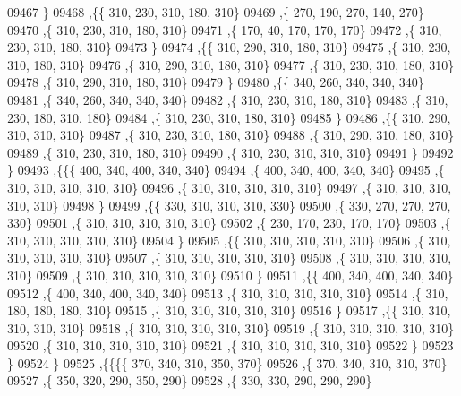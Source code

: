 \begin{DoxyCode}
09467     \}
09468    ,\{\{   310,   230,   310,   180,   310\}
09469     ,\{   270,   190,   270,   140,   270\}
09470     ,\{   310,   230,   310,   180,   310\}
09471     ,\{   170,    40,   170,   170,   170\}
09472     ,\{   310,   230,   310,   180,   310\}
09473     \}
09474    ,\{\{   310,   290,   310,   180,   310\}
09475     ,\{   310,   230,   310,   180,   310\}
09476     ,\{   310,   290,   310,   180,   310\}
09477     ,\{   310,   230,   310,   180,   310\}
09478     ,\{   310,   290,   310,   180,   310\}
09479     \}
09480    ,\{\{   340,   260,   340,   340,   340\}
09481     ,\{   340,   260,   340,   340,   340\}
09482     ,\{   310,   230,   310,   180,   310\}
09483     ,\{   310,   230,   180,   310,   180\}
09484     ,\{   310,   230,   310,   180,   310\}
09485     \}
09486    ,\{\{   310,   290,   310,   310,   310\}
09487     ,\{   310,   230,   310,   180,   310\}
09488     ,\{   310,   290,   310,   180,   310\}
09489     ,\{   310,   230,   310,   180,   310\}
09490     ,\{   310,   230,   310,   310,   310\}
09491     \}
09492    \}
09493   ,\{\{\{   400,   340,   400,   340,   340\}
09494     ,\{   400,   340,   400,   340,   340\}
09495     ,\{   310,   310,   310,   310,   310\}
09496     ,\{   310,   310,   310,   310,   310\}
09497     ,\{   310,   310,   310,   310,   310\}
09498     \}
09499    ,\{\{   330,   310,   310,   310,   330\}
09500     ,\{   330,   270,   270,   270,   330\}
09501     ,\{   310,   310,   310,   310,   310\}
09502     ,\{   230,   170,   230,   170,   170\}
09503     ,\{   310,   310,   310,   310,   310\}
09504     \}
09505    ,\{\{   310,   310,   310,   310,   310\}
09506     ,\{   310,   310,   310,   310,   310\}
09507     ,\{   310,   310,   310,   310,   310\}
09508     ,\{   310,   310,   310,   310,   310\}
09509     ,\{   310,   310,   310,   310,   310\}
09510     \}
09511    ,\{\{   400,   340,   400,   340,   340\}
09512     ,\{   400,   340,   400,   340,   340\}
09513     ,\{   310,   310,   310,   310,   310\}
09514     ,\{   310,   180,   180,   180,   310\}
09515     ,\{   310,   310,   310,   310,   310\}
09516     \}
09517    ,\{\{   310,   310,   310,   310,   310\}
09518     ,\{   310,   310,   310,   310,   310\}
09519     ,\{   310,   310,   310,   310,   310\}
09520     ,\{   310,   310,   310,   310,   310\}
09521     ,\{   310,   310,   310,   310,   310\}
09522     \}
09523    \}
09524   \}
09525  ,\{\{\{\{   370,   340,   310,   350,   370\}
09526     ,\{   370,   340,   310,   310,   370\}
09527     ,\{   350,   320,   290,   350,   290\}
09528     ,\{   330,   330,   290,   290,   290\}

\end{DoxyCode}
